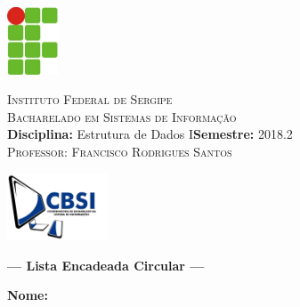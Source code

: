 \documentclass[11pt,a4paper]{article}
\begin{document}
	

	
\frenchspacing
\begin{center}
    \begin{minipage}{1.7cm}
		\begin{center}
			\includegraphics[height=2.0cm]{libs/logo-ifs-micro.png}
		\end{center}
	\end{minipage}
	\begin{minipage}{11.4cm}
		\begin{center}
				{\small \textsc{Instituto Federal de Sergipe}			\\
						  \textsc{Bacharelado em Sistemas de Informação} \\
                         \textbf{Disciplina:} Estrutura de Dados I\hspace{.65cm}\textbf{Semestre:} 2018.2\\
                          \textsc{Professor: Francisco Rodrigues Santos}\\
                }
		\end{center}
	\end{minipage}
	\begin{minipage}{1.6cm}
		\begin{center}
			\includegraphics[height=2cm]{libs/CBSI-logo.jpg}
		\end{center}
	\end{minipage}
\end{center}


{\sf
  \begin{center}
    \Large \textbf{--- Lista Encadeada Circular ---}%
  \end{center}
}\bigskip

\setlength{\marginparwidth}{5cm}
\small \noindent \textbf{Nome:}\hspace{0.3cm}\hrulefill \hrulefill

\reversemarginpar
\thispagestyle{empty}\bigskip

\end{document}

